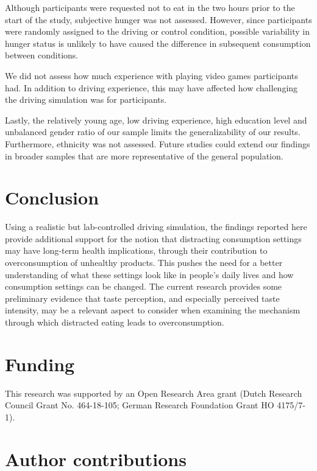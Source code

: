 \documentclass[authordate, empirical]{jote-new-article}
\begin{document}
Although participants were requested not to eat in the two hours prior to the start of the study, subjective hunger was not assessed. However, since participants were randomly assigned to the driving or control condition, possible variability in hunger status is unlikely to have caused the difference in subsequent consumption between conditions.



We did not assess how much experience with playing video games participants had. In addition to driving experience, this may have affected how challenging the driving simulation was for participants.



Lastly, the relatively young age, low driving experience, high education level and unbalanced gender ratio of our sample limits the generalizability of our results. Furthermore, ethnicity was not assessed. Future studies could extend our findings in broader samples that are more representative of the general population.

\section{Conclusion}



Using a realistic but lab-controlled driving simulation, the findings reported here provide additional support for the notion that distracting consumption settings may have long-term health implications, through their contribution to overconsumption of unhealthy products. This pushes the need for a better understanding of what these settings look like in people’s daily lives and how consumption settings can be changed. The current research provides some preliminary evidence that taste perception, and especially perceived taste intensity, may be a relevant aspect to consider when examining the mechanism through which distracted eating leads to overconsumption.

\section{Funding}
This research was supported by an Open Research Area grant (Dutch Research Council Grant No. 464-18-105; German Research Foundation Grant HO 4175/7-1).


\section{Author contributions}
\end{document}
